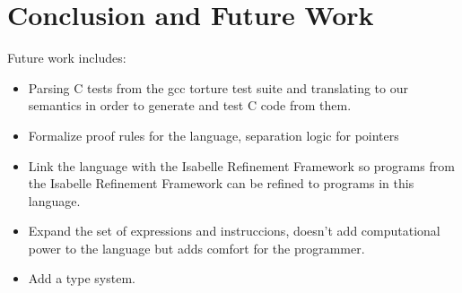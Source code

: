 \chapter{Conclusion and Future Work}\label{chapter:conclusion}

Future work includes:
\begin{itemize}
\item Parsing C tests from the gcc torture test suite and translating to our semantics in order to generate and test C code from them.
\item Formalize proof rules for the language, separation logic for pointers
\item Link the language with the Isabelle Refinement Framework so programs from the Isabelle Refinement Framework can be refined to programs in this language.
\item Expand the set of expressions and instruccions, doesn't add computational power to the language but adds comfort for the programmer.
\item Add a type system.
\end{itemize}
